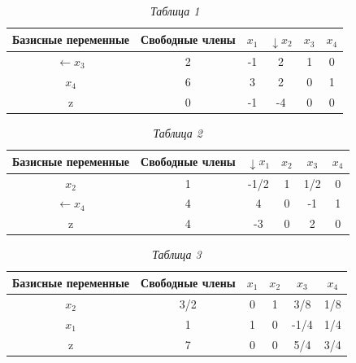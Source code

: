 \begin{table}[h]
	\label{table_5_6}
	\caption*{\hspace{0.8\linewidth} \textit{Таблица 1}}
	\centering%
		\begin{tabular}{|c|*{5}{c|}}
			\hline
			\parbox{2cm}{\centering Базисные переменные}& \parbox{2cm}{\centering Свободные члены} & \parbox{1.2cm}{\centering $x_1$} & \parbox{1.2cm}{\centering $\downarrow x_2$} & \parbox{1.2cm}{\centering $x_3$} & \parbox{1.2cm}{\centering $x_4$}\\
			\hline
			$\leftarrow x_3$ & 2 & -1 & 2 & 1 & 0\\
			\hline
			$x_4$ & 6 & 3 & 2 & 0 & 1 \\
			\hline
			z & 0 & -1 & -4 & 0 & 0 \\
			\hline
		\end{tabular}
\end{table}

\begin{table}[h!]
\label{table_5_7}
\caption*{\hspace{0.8\linewidth} \textit{Таблица 2}}
\centering
\begin{tabular}{|c|*{5}{c|}}
\hline
\parbox{2cm}{\centering Базисные переменные}& \parbox{2cm}{\centering Свободные члены} & \parbox{1.2cm}{\centering $\downarrow x_1$} & \parbox{1.2cm}{\centering $ x_2$} & \parbox{1.2cm}{\centering $x_3$} & \parbox{1.2cm}{\centering $x_4$}\\
\hline
$x_2$ & 1 & -1/2 & 1 & 1/2 & 0\\
\hline
$ \leftarrow x_4 $ & 4 &  4 & 0 & -1 & 1 \\
\hline
z & 4 & -3 & 0 & 2 & 0 \\
\hline
\end{tabular}
\end{table}
\newpage
\begin{table}[h]
\label{table_5_8}
\caption*{\hspace{0.8\linewidth} \textit{Таблица 3}}
\centering
\begin{tabular}{|c|*{5}{c|}}
\hline
\parbox{2cm}{\centering Базисные переменные}& \parbox{2cm}{\centering Свободные члены} & \parbox{1.2cm}{\centering $x_1$} & \parbox{1.2cm}{\centering $ x_2$} & \parbox{1.2cm}{\centering $x_3$} & \parbox{1.2cm}{\centering $x_4$}\\
\hline
$x_2$ & 3/2 & 0 & 1 & 3/8 & 1/8\\
\hline
$ x_1 $ & 1 & 1 & 0 & -1/4 & 1/4 \\
\hline
z & 7 & 0 & 0 & 5/4 & 3/4 \\
\hline
\end{tabular}
\end{table}

